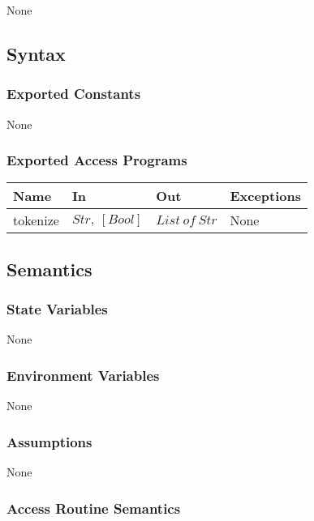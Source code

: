 \documentclass[12pt, titlepage]{article}
\begin{document}
None

\subsection{Syntax}

\subsubsection{Exported Constants}

None

\subsubsection{Exported Access Programs}

\begin{center}
\begin{tabular}{p{3cm} p{4cm} p{4cm} p{3cm}}
\hline
\textbf{Name} & \textbf{In} & \textbf{Out} & \textbf{Exceptions} \\
\hline
tokenize & $Str,\ [Bool]$ & $List\ of\ Str$ & None \\
\hline
\end{tabular}
\end{center}

\subsection{Semantics}

\subsubsection{State Variables}

None

\subsubsection{Environment Variables}

None

\subsubsection{Assumptions}

None

\subsubsection{Access Routine Semantics}
\end{document}
